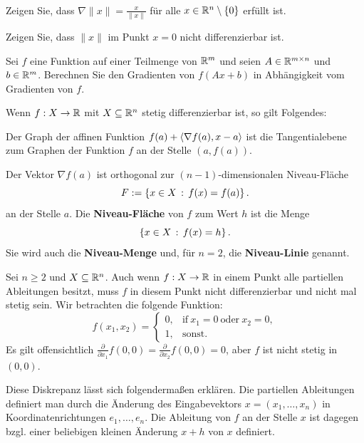 \begin{aufg} {\ } 
	\begin{enuma} 
		\item Zeigen Sie, dass $\nabla \|x\| = \frac{ x }{\|x\|}$ für alle $x \in \mathbb{R}^n \setminus \{0\}$ erfüllt ist. 
		\item Zeigen Sie, dass $\|x\|$ im Punkt $x=0$ nicht differenzierbar ist. 
		\item Sei $f$ eine Funktion auf einer Teilmenge von $\mathbb{R}^m$ und seien $A \in \mathbb{R}^{m \times n}$ und $b \in \mathbb{R}^m$. Berechnen Sie den Gradienten von $f( A x +b)$ in Abhängigkeit vom Gradienten von $f$. 
	\end{enuma} 
\end{aufg} 

\begin{bem} Wenn $ f: X \to \mathbb{R}$ mit $X \subseteq \mathbb{R}^n$ stetig differenzierbar ist, so gilt Folgendes: 
	\begin{enuma}
		\item Der Graph der affinen Funktion $f(a) + \left< \nabla f(a) ,  x-a \right>$ ist die Tangentialebene zum Graphen der Funktion $f$ an der Stelle $(a,f(a))$. 
		\item Der Vektor $\nabla f(a)$ ist orthogonal zur $(n-1)$-dimensionalen Niveau-Fläche
		\[
			F := \left\{ x \in X \,:\, f(x) = f(a) \right\}.
		\]
		an der Stelle $a$.		
		Die \textbf{Niveau-Fläche} von $f$ zum Wert $h$ ist die Menge 
		\[
			\left\{ x \in X \,:\, f(x) = h \right\}.
		\]
		Sie wird auch die \textbf{Niveau-Menge} und, für $n=2$, die \textbf{Niveau-Linie} genannt.
	\end{enuma} 
\end{bem} 


\begin{bem} 	
	Sei $n \ge 2$ und $X \subseteq \mathbb{R}^n$.
	Auch wenn $f : X \to \mathbb{R}$ in einem Punkt alle partiellen Ableitungen besitzt, muss $f$ in diesem Punkt nicht differenzierbar und nicht mal stetig sein. 
	Wir betrachten die folgende Funktion: 
	\[
		f(x_1,x_2) = \begin{cases} 
			0, & \text{if} \ x_1 =0 \ \text{oder} \ x_2 = 0,
			\\ 1, & \text{sonst}.
		\end{cases} 
	\]
	Es gilt offensichtlich $\frac{\partial}{\partial x_1} f (0,0) = \frac{\partial}{\partial x_2} f(0,0) = 0$, aber $f$ ist nicht stetig in $(0,0)$. 
	
	Diese Diskrepanz lässt sich folgendermaßen erklären. Die partiellen Ableitungen definiert man durch die Änderung des Eingabevektors $x = (x_1,\ldots,x_n)$ in Koordinatenrichtungen $e_1,\ldots,e_n$. Die Ableitung von $f$ an der Stelle $x$ ist dagegen  bzgl. einer beliebigen kleinen Änderung $x+h$ von $x$ definiert. 
	
\end{bem} 

